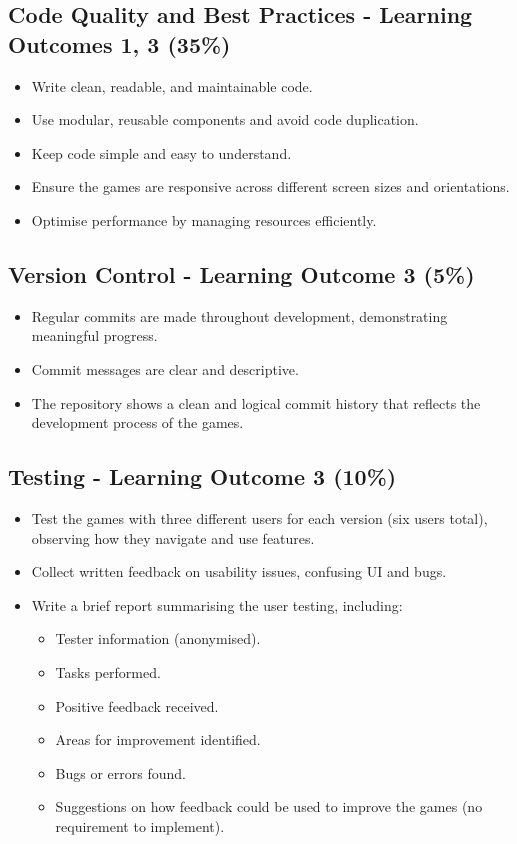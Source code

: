 \documentclass{article}
\begin{document}
\subsection*{Code Quality and Best Practices - Learning Outcomes 1, 3 (35\%)}
\begin{itemize} 
\item Write clean, readable, and maintainable code.
\item Use modular, reusable components and avoid code duplication.
\item Keep code simple and easy to understand.
\item Ensure the games are responsive across different screen sizes and orientations.
\item Optimise performance by managing resources efficiently.
\end{itemize}  
 
\subsection*{Version Control - Learning Outcome 3 (5\%)}
\begin{itemize}
  \item Regular commits are made throughout development, demonstrating meaningful progress.
  \item Commit messages are clear and descriptive.
  \item The repository shows a clean and logical commit history that reflects the development process of the games.
\end{itemize}

\subsection*{Testing - Learning Outcome 3 (10\%)}
\begin{itemize}
  \item Test the games with three different users for each version (six users total), observing how they navigate and use features.
  \item Collect written feedback on usability issues, confusing UI and bugs.
  \item Write a brief report summarising the user testing, including:
  \begin{itemize}
    \item Tester information (anonymised).
    \item Tasks performed.
    \item Positive feedback received.
    \item Areas for improvement identified.
    \item Bugs or errors found.
    \item Suggestions on how feedback could be used to improve the games (no requirement to implement).
  \end{itemize}
\end{itemize}
\end{document}
